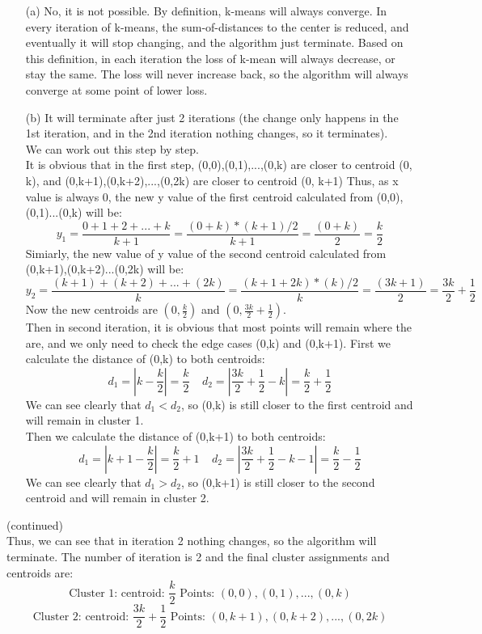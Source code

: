 \documentclass[11pt]{article}
\begin{document}
\begin{answertext}{18cm}{}
\begin{enumerate}
\item[(a)] No, it is not possible. By definition, k-means will always converge. In every iteration of k-means, the sum-of-distances to the center is reduced, and eventually it will stop changing, and the algorithm just terminate. Based on this definition, in each iteration the loss of k-mean will always decrease, or stay the same. The loss will never increase back, so the algorithm will always converge at some point of lower loss.\\


\item[(b)] It will terminate after just 2 iterations (the change only happens in the 1st iteration, and in the 2nd iteration nothing changes, so it terminates).\\
We can work out this step by step.\\ It is obvious that in the first step, (0,0),(0,1),...,(0,k) are closer to centroid (0, k), and (0,k+1),(0,k+2),...,(0,2k) are closer to centroid (0, k+1)
Thus, as x value is always 0, the new y value of the first centroid calculated from (0,0),(0,1)...(0,k) will be:
$$y_1 = \frac{0+1+2+...+k}{k+1}=\frac{(0+k)*(k+1)/2}{k+1}=\frac{(0+k)}{2}=\frac{k}{2}$$
Simiarly, the new value of y value of the second centroid calculated from (0,k+1),(0,k+2)...(0,2k) will be:
$$y_2 = \frac{(k+1) + (k+2) + ...+(2k)}{k}=\frac{(k+1+2k)*(k)/2}{k}=\frac{(3k+1)}{2}=\frac{3k}{2}+\frac{1}{2}$$
Now the new centroids are $(0,\frac{k}{2})$ and $(0,\frac{3k}{2}+\frac{1}{2})$.\\
Then in second iteration, it is obvious that most points will remain where the are, and we only need to check the edge cases (0,k) and (0,k+1). First we calculate the distance of (0,k) to both centroids:
$$d_1=|k-\frac{k}{2}|=\frac{k}{2}\ \ \ \ \ d_2=|\frac{3k}{2}+\frac{1}{2}-k|=\frac{k}{2}+\frac{1}{2}$$
We can see clearly that $d_1 < d_2$, so (0,k) is still closer to the first centroid and will remain in cluster 1.\\
Then we calculate the distance of (0,k+1) to both centroids:
$$d_1=|k+1-\frac{k}{2}|=\frac{k}{2}+1\ \ \ \ \ d_2=|\frac{3k}{2}+\frac{1}{2}-k-1|=\frac{k}{2}-\frac{1}{2}$$
We can see clearly that $d_1 > d_2$, so (0,k+1) is still closer to the second centroid and will remain in cluster 2.\\
\end{enumerate}
\end{answertext} 
\begin{answertext}{18cm}{}
(continued)\\
Thus, we can see that in iteration 2 nothing changes, so the algorithm will terminate. The number of iteration is 2 and the final cluster assignments and centroids are:\\
$$\text{Cluster 1: centroid: }\frac{k}{2}\text{ Points: }(0,0),(0,1),...,(0,k)$$
$$\text{Cluster 2: centroid: }\frac{3k}{2}+\frac{1}{2}\text{ Points: }(0,k+1),(0,k+2),...,(0,2k)$$
\end{answertext} 
\end{document}
